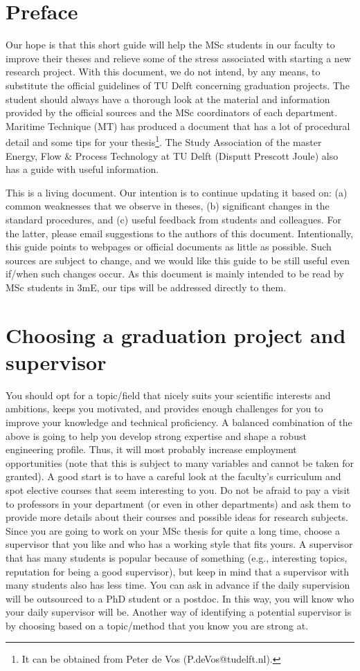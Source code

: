 \documentclass{article}
\begin{document}
\section{Preface}
Our hope is that this short guide will help the MSc students in our faculty to improve their theses and relieve some of the stress associated with starting a new research project. With this document, we do not intend, by any means, to substitute the official guidelines of TU Delft concerning graduation projects. The student should always have a thorough look at the material and information provided by the official sources and the MSc coordinators of each department. Maritime Technique (MT) has produced a document that has a lot of procedural detail and some tips for your thesis\footnote{It can be obtained from Peter de Vos (P.deVos@tudelft.nl).}. The Study Association of the master Energy, Flow \& Process Technology at TU Delft (Disputt Prescott Joule) also has a guide with useful information. 

This is a living document. Our intention is to continue updating it based on: (a) common weaknesses that we observe in theses, (b) significant changes in the standard procedures, and (c) useful feedback from students and colleagues. For the latter, please email suggestions to the authors of this document. Intentionally, this guide points to webpages or official documents as little as possible. Such sources are subject to change, and we would like this guide to be still useful even if/when such changes occur. As this document is mainly intended to be read by MSc students in 3mE, our tips will be addressed directly to them. 

\section{Choosing a graduation project and supervisor}
You should opt for a topic/field that nicely suits your scientific interests and ambitions, keeps you motivated, and provides enough challenges for you to improve your knowledge and technical proficiency. A balanced combination of the above is going to help you develop strong expertise and shape a robust engineering profile. Thus, it will most probably increase employment opportunities (note that this is subject to many variables and cannot be taken for granted). A good start is to have a careful look at the faculty’s curriculum and spot elective courses that seem interesting to you. Do not be afraid to pay a visit to professors in your department (or even in other departments) and ask them to provide more details about their courses and possible ideas for research subjects. Since you are going to work on your MSc thesis for quite a long time, choose a supervisor that you like and who has a working style that fits yours. A supervisor that has many students is popular because of something (e.g., interesting topics, reputation for being a good supervisor), but keep in mind that a supervisor with many students also has less time. You can ask in advance if the daily supervision will be outsourced to a PhD student or a postdoc. In this way, you will know who your daily supervisor will be. Another way of identifying a potential supervisor is by choosing based on a topic/method that you know you are strong at.
\end{document}
